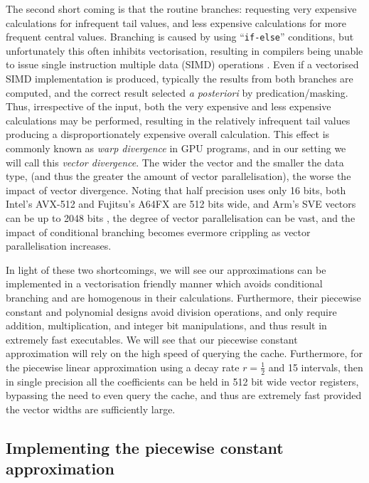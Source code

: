 \documentclass[manuscript,review]{acmart}
\begin{document}
The second short coming is that the routine branches: requesting very expensive calculations for infrequent tail values, and less expensive calculations for more frequent central values. Branching is caused by using ``\texttt{if-else}'' conditions, but unfortunately this often inhibits vectorisation, resulting in compilers being unable to issue single instruction multiple data (SIMD) operations \citep{vanderpas2017using}. Even if a vectorised SIMD implementation is produced, typically the results from both branches are computed, and the correct result selected \textit{a posteriori} by predication/masking. Thus, irrespective of the input, both the very expensive and less expensive calculations may be performed, resulting in the relatively infrequent tail values producing a disproportionately expensive overall calculation. This effect is commonly known as \emph{warp divergence} in GPU programs, and in our setting we will call this \emph{vector divergence}. The wider the vector and the smaller the data type, (and thus the greater the amount of vector parallelisation), the worse the impact of vector divergence. Noting that half precision uses only 16 bits, both Intel's AVX-512 and Fujitsu's A64FX are 512 bits wide, and Arm's SVE vectors can be up to 2048 bits \citep{petrogalli2016sneak_peak,stephens2017arm}, the degree of vector parallelisation can be vast, and the impact of conditional branching becomes evermore crippling as vector parallelisation increases. 

In light of these two shortcomings, we will see our approximations can be implemented in a vectorisation friendly manner which avoids conditional branching and are homogenous in their calculations. Furthermore, their piecewise constant and polynomial designs avoid division operations, and only require addition, multiplication, and integer bit manipulations, and thus result in extremely fast executables. We will see that our piecewise constant approximation will rely on the high speed of querying the cache. Furthermore, for the piecewise linear approximation using a decay rate $ r = \tfrac{1}{2} $ and 15 intervals, then in single precision all the coefficients can be held in 512 bit wide vector registers, bypassing the need to even query the cache, and thus are extremely fast provided the vector widths are sufficiently large. 

\subsection{Implementing the piecewise constant approximation}
\end{document}

